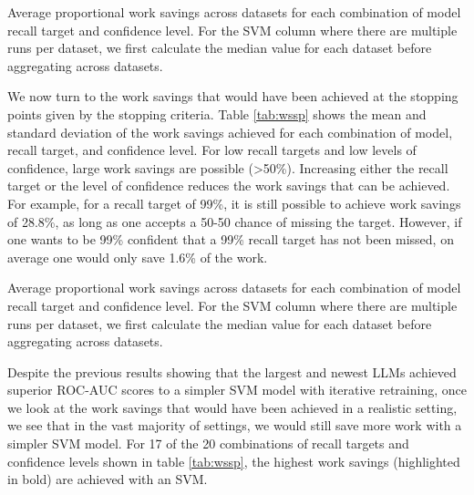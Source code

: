 \documentclass{article}
\begin{document}
	\begin{table}
		\centering
		
		\caption{Average proportional work savings across datasets for each combination of  model recall target and confidence level. For the SVM column where there are multiple runs per dataset, we first calculate the median value for each dataset before aggregating across datasets.}
		\label{tab:wssp}
	\end{table}
	
	We now turn to the work savings that would have been achieved at the stopping points given by the stopping criteria. Table \ref{tab:wssp} shows the mean and standard deviation of the work savings achieved for each combination of model, recall target, and confidence level. For low recall targets and low levels of confidence, large work savings are possible (>50\%). Increasing either the recall target or the level of confidence reduces the work savings that can be achieved. For example, for a recall target of 99\%, it is still possible to achieve work savings of 28.8\%, as long as one accepts a 50-50 chance of missing the target. However, if one wants to be 99\% confident that a 99\% recall target has not been missed, on average one would only save 1.6\% of the work.
	
	\begin{table}
		\centering
		
		\caption{Average proportional work savings across datasets for each combination of  model recall target and confidence level. For the SVM column where there are multiple runs per dataset, we first calculate the median value for each dataset before aggregating across datasets.}
		\label{tab:wsst}
	\end{table}
	
	Despite the previous results showing that the largest and newest LLMs achieved superior ROC-AUC scores to a simpler SVM model with iterative retraining, once we look at the work savings that would have been achieved in a realistic setting, we see that in the vast majority of settings, we would still save more work with a simpler SVM model. For 17 of the 20 combinations of recall targets and confidence levels shown in table \ref{tab:wssp}, the highest work savings (highlighted in bold) are achieved with an SVM.
	
\end{document}

